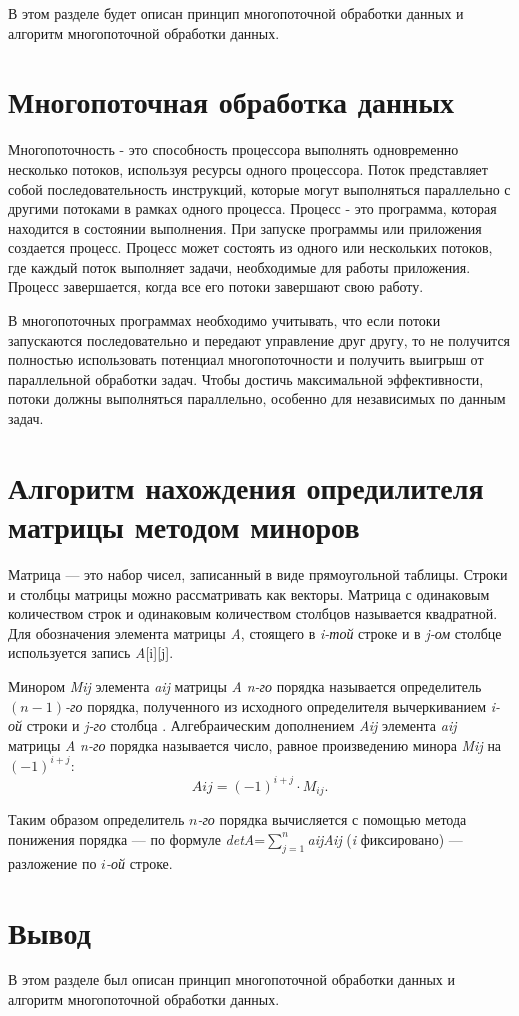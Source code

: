 \hspace{\parindent}В этом разделе будет описан принцип многопоточной обработки данных и алгоритм многопоточной обработки данных.

\section{Многопоточная обработка данных}
Многопоточность - это способность процессора выполнять одновременно несколько потоков, используя ресурсы одного процессора. Поток представляет собой последовательность инструкций, которые могут выполняться параллельно с другими потоками в рамках одного процесса.
Процесс - это программа, которая находится в состоянии выполнения. При запуске программы или приложения создается процесс. Процесс может состоять из одного или нескольких потоков, где каждый поток выполняет задачи, необходимые для работы приложения. Процесс завершается, когда все его потоки завершают свою работу.

В многопоточных программах необходимо учитывать, что если потоки запускаются последовательно и передают управление друг другу, то не получится полностью использовать потенциал многопоточности и получить выигрыш от параллельной обработки задач. Чтобы достичь максимальной эффективности, потоки должны выполняться параллельно, особенно для независимых по данным задач.



\section{Алгоритм нахождения опредилителя матрицы методом миноров}
Матрица --- это набор чисел, записанный в виде прямоугольной таблицы.
Строки и столбцы матрицы можно рассматривать как векторы. Матрица с одинаковым количеством строк и одинаковым количеством столбцов называется квадратной. Для обозначения элемента матрицы \textit{A}, стоящего в \textit{i-той} строке и в \textit{j-ом} столбце используется запись \textit{A}[i][j].

Минором \textit{Mij} элемента \textit{aij} матрицы \textit{A} \textit{n}\textit{-го} порядка называется определитель $(n-1)$\textit{-го} порядка, полученного из исходного определителя вычеркиванием \textit{i}\textit{-ой} строки и \textit{j}\textit{-го} столбца \cite{minor}.
Алгебраическим дополнением \textit{Aij} элемента \textit{aij} матрицы \textit{A} \textit{n}\textit{-го} порядка называется число, равное произведению минора \textit{Mij} на $(-1)^{i+j}$: 
\begin{equation}
	Aij=(-1)^{i+j}\cdot M_{ij}.
\end{equation}

Таким образом определитель $n$\textit{-го} порядка вычисляется с помощью метода понижения порядка --- по формуле \textit{detA}=$\sum\limits_{j=1}^n$\textit{aij}\textit{Aij} (\textit{i} фиксировано) --- разложение по $i$\textit{-ой} строке.

\section{Вывод}
В этом разделе был описан принцип многопоточной обработки данных и алгоритм многопоточной обработки данных.


